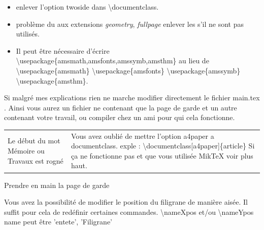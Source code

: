 \documentclass[10pt]{article}
\begin{document}
\begin{itemize}
 \item  enlever l'option twoside dans \textbackslash documentclass.
 \item probl\`eme du aux extensions \emph{geometry}, \emph{fullpage} enlever les s'il ne sont pas utilis\'es.
 \item  Il peut \^etre n\'ecessaire d'\'ecrire\\ 
			\mbox{\textbackslash usepackage\{amsmath,amsfonts,amssymb,amsthm\}}
		 au lieu de \mbox{\textbackslash usepackage\{amsmath\}} \mbox{\textbackslash usepackage\{amsfonts\}} \mbox{\textbackslash usepackage\{amssymb\}} \mbox{\textbackslash usepackage\{amsthm\}}.
\end{itemize}

Si malgr\'e mes explications rien ne marche modifier directement le fichier main.tex .
Ainsi vous aurez un fichier ne contenant que la page de garde et un autre contenant votre travail, ou compiler chez un ami pour qui cela fonctionne.
\noindent
\begin{tabular}{lp{5cm}}
\hline
  Le d\'ebut du mot M\'emoire ou Travaux est rogn\'e&%
   Vous avez oubli\'e de mettre l'option a4paper a documentclass.
   exple : \textbackslash documentclass[a4paper]\{article\}
   Si \c ca ne fonctionne pas et que vous utilis\'ee MikTeX voir plus haut.
\end{tabular}

   

Prendre en main la page de garde

Vous avez la possibilité de modifier le position du filigrane de manière aisée.
Il suffit pour cela de redéfinir certaines commandes.
    \textbackslash nameXpos et/ou \textbackslash nameYpos
name peut être 'entete', 'Filigrane' 
\end{document}
